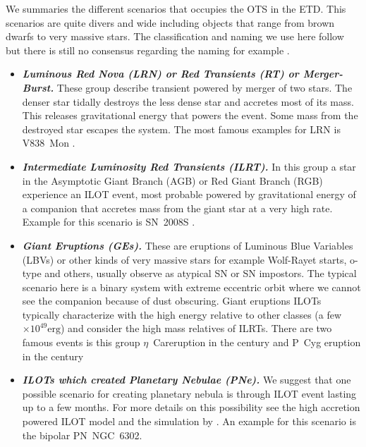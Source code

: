 \documentclass[modern]{aastex63}
\newcommand{\emphbf}[1]{\textbf{\emph{#1}}}
\newcommand{\erg}{\mathrm{erg}}
\newcommand{\etc}{$\eta$~Car}
\begin{document}
We summaries the different scenarios that occupies the OTS in the ETD.
This scenarios are quite divers and wide including objects that range from brown dwarfs to very massive stars.
The classification and naming we use here follow \citep{2018Galax...6...82K} but there is still no consensus regarding the naming for example \cite{2019ApJ...886...40J,2019A&A...630A..75P}.

\begin{itemize}

\item \label{lrn-ilot-item} \emphbf{Luminous Red Nova (LRN) or Red Transients (RT) or Merger-Burst.} 
These group describe transient powered by merger of two stars.
The denser star tidally destroys the less dense star and accretes most of its mass. 
This releases gravitational energy that powers the event. 
Some mass from the destroyed star escapes the system.
The most famous examples for LRN is V838~Mon \citep{2005A&A...441.1099T}.

\item \label{ilrt-ilot-item} \emphbf{Intermediate Luminosity Red Transients (ILRT).} 
In this group a star in the Asymptotic Giant Branch (AGB) or Red Giant Branch (RGB) experience an ILOT event, most probable powered by gravitational energy of a companion that accretes mass from the giant star at a very high rate. 
Example for this scenario is SN~2008S \citep{2009ApJ...697L..49S,2009ApJ...705.1425P,2010MNRAS.403..474W,2016MNRAS.462..217S}.

\item \label{ges-ilot-item} \emphbf{Giant Eruptions (GEs).} 
These are eruptions of Luminous Blue Variables (LBVs) or other kinds of very massive stars for example Wolf-Rayet starts, o-type and others, usually observe as atypical SN or SN impostors.
The typical scenario here is a binary system with extreme eccentric orbit where we cannot see the companion because of dust obscuring.
Giant eruptions ILOTs typically characterize with the high energy relative to other classes (a few $\times10^{49} \erg$) and consider the high mass relatives of ILRTs. 
There are two famous events is this group \etc eruption in the  century \citep{2010ApJ...723..602K} and P~Cyg eruption in the  century \citep{2010ApJ...723..602K,2018NewA...65...29M} 

\item \label{pne-ilot-item} \emphbf{ILOTs which created Planetary Nebulae (PNe).} 
We suggest that one possible scenario for creating planetary nebula is through ILOT event lasting up to a few months.
For more details on this possibility see the high accretion powered ILOT model \citep{2016RAA....16...99K} and the simulation by \cite{2013MNRAS.436.1961A}.
An example for this scenario is the bipolar PN~NGC~6302.


\end{itemize}
\end{document}

